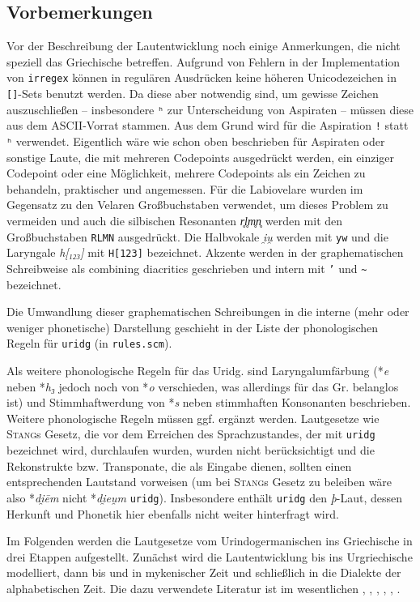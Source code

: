 \documentclass[12pt,a4paper,normalheadings]{scrartcl}
\def\rek#1{*\textit{#1}}
\def\bel#1{\textit{#1}}
\def\tt#1{\texttt{#1}}
\begin{document}
\subsection{Vorbemerkungen}
Vor der Beschreibung der Lautentwicklung noch einige Anmerkungen,
die nicht speziell das Griechische betreffen.
Aufgrund von Fehlern in der Implementation von \tt{irregex}
können in regulären Ausdrücken keine höheren Unicodezeichen
in \tt{[]}-Sets benutzt werden.
Da diese aber notwendig sind, um gewisse Zeichen auszuschließen
-- insbesondere \tt{ʰ} zur Unterscheidung von Aspiraten --
müssen diese aus dem ASCII-Vorrat stammen.
Aus dem Grund wird für die Aspiration \tt{!} statt \tt{ʰ} verwendet.
Eigentlich wäre wie schon oben beschrieben für Aspiraten oder sonstige Laute,
die mit mehreren Codepoints ausgedrückt werden,
ein einziger Codepoint
oder eine Möglichkeit, mehrere Codepoints als ein Zeichen zu behandeln,
praktischer und angemessen.
Für die Labiovelare wurden im Gegensatz zu den Velaren Großbuchstaben verwendet,
um dieses Problem zu vermeiden und auch
die silbischen Resonanten \bel{r̥l̥m̥n̥} werden mit den Großbuchstaben \tt{RLMN} ausgedrückt.
Die Halbvokale \bel{i̯u̯} werden mit \tt{yw} und
die Laryngale \bel{h[₁₂₃]} mit \tt{H[123]} bezeichnet.
Akzente werden in der graphematischen Schreibweise
als combining diacritics geschrieben und intern mit \tt{'} und \tt{\textasciitilde}
bezeichnet.

Die Umwandlung dieser graphematischen Schreibungen in die interne
(mehr oder weniger phonetische) Darstellung geschieht in der Liste der
phonologischen Regeln für \tt{uridg} (in \tt{rules.scm}).

Als weitere phonologische Regeln für das Uridg.
sind Laryngalumfärbung (\rek{e} neben \rek{h₃} jedoch noch von \rek{o}
verschieden, was allerdings für das Gr. belanglos ist)
und Stimmhaftwerdung von \rek{s} neben stimmhaften Konsonanten beschrieben.
Weitere phonologische Regeln müssen ggf. ergänzt werden.
Lautgesetze wie \textsc{Stang}s Gesetz,
die vor dem Erreichen des Sprachzustandes, der mit \tt{uridg} bezeichnet wird,
durchlaufen wurden,
wurden nicht berücksichtigt und die Rekonstrukte bzw. Transponate,
die als Eingabe dienen, sollten einen entsprechenden Lautstand vorweisen
(um bei \textsc{Stang}s Gesetz zu beleiben wäre also \rek{di̯ēm} nicht \rek{di̯eu̯m} \tt{uridg}).
Insbesondere enthält \tt{uridg} den \textit{þ}-Laut,
dessen Herkunft und Phonetik hier ebenfalls nicht weiter hinterfragt wird.

Im Folgenden werden die Lautgesetze vom Urindogermanischen ins Griechische
in drei Etappen aufgestellt.
Zunächst wird die Lautentwicklung bis ins Urgriechische modelliert,
dann bis und in mykenischer Zeit und schließlich in die Dialekte
der alphabetischen Zeit.
Die dazu verwendete Literatur ist im wesentlichen \cite{rix},
\cite{bart_langvok},
\cite{bart_frueh},
\cite{bart_hand},
\cite{sihler},
\cite{buck}.
\end{document}

